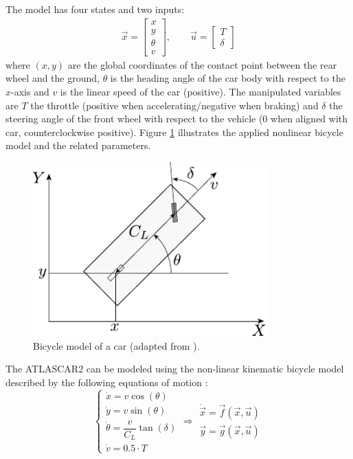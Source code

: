 The model has four states and two inputs:
\begin{equation}
\begin{array}{cc}
\vec{x}=\begin{bmatrix}
x\\y\\\theta\\v 
\end{bmatrix},\qquad 
\vec{u}=\begin{bmatrix}
T\\\delta 
\end{bmatrix}
\end{array} 
\end{equation}
where $(x,y)$ are the global coordinates of the contact point between the rear wheel and the ground, $\theta$ is the heading angle of the car body with respect to the $x$-axis and $v$ is the linear speed of the car (positive). The manipulated variables are $T$ the throttle (positive when accelerating/negative when braking) and $\delta$ the steering angle of the front wheel with respect to the vehicle ($0$ when aligned with car, counterclockwise positive). Figure \ref{fig:car_model} illustrates the applied nonlinear bicycle model and the related parameters.
\begin{figure}[!h]
	\centering
	\includegraphics[width=0.80\textwidth]{../figure/car_model.pdf}
	\caption{Bicycle model of a car (adapted from \cite{siciliano}).}
	\label{fig:car_model}
\end{figure}

The ATLASCAR2 can be modeled using the non-linear kinematic bicycle model described by the following equations of motion \cite{safety} \cite{swarms}:
\begin{equation}
\label{eqn:dynamics_model_obstacle_avoidance}
\left \{ \begin{array}{llll}
\dot{x} = v\cos(\theta)\\
\dot{y} = v\sin(\theta)\\
\dot{\theta} =\dfrac{v}{C_L}\tan(\delta)\\
\dot{v} =0.5 \cdot T
\end{array} 
\right .
\Longrightarrow 
\begin{array}{llll}
\dot{\vec{x}} = \vec{f}(\vec{x},\vec{u})\\
\vec{y} = \vec{g}(\vec{x},\vec{u})
\end{array}
\end{equation}

